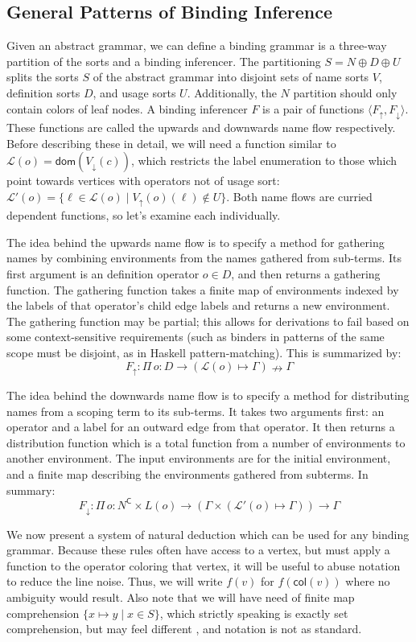 \documentclass[11pt]{article} %
\theoremstyle{definition}
\newcommand{\Ell}{\mathscr{L}}
\begin{document}
\subsection{General Patterns of Binding Inference}

Given an abstract grammar, we can define a binding grammar is a three-way partition of the sorts and a binding inferencer.
The partitioning $S = N \oplus D \oplus U$ splits the sorts $S$ of the abstract grammar into disjoint sets of name sorts $V$, definition sorts $D$, and usage sorts $U$.
Additionally, the $N$ partition should only contain colors of leaf nodes.
A binding inferencer $F$ is a pair of functions $\langle F_\uparrow, F_\downarrow \rangle$.
These functions are called the upwards and downwards name flow respectively.
Before describing these in detail, we will need a function similar to $\Ell(o) = \mathsf{dom}(V_\downarrow(c))$, which restricts the label enumeration to those which point towards vertices with operators not of usage sort: $\Ell'(o) = \{\ell \in \Ell(o) \mid V_\uparrow(o)(\ell) \nin U\}$.
Both name flows are curried dependent functions, so let's examine each individually.

The idea behind the upwards name flow is to specify a method for gathering names by combining environments from the names gathered from sub-terms.
Its first argument is an definition operator $o \in D$, and then returns a gathering function.
The gathering function takes a finite map of environments indexed by the labels of that operator's child edge labels and returns a new environment.
The gathering function may be partial; this allows for derivations to fail based on some context-sensitive requirements (such as binders in patterns of the same scope must be disjoint, as in Haskell pattern-matching).
This is summarized by:
    $$F_\uparrow : \Pi\,o{:}D \to (\Ell(o) \mapsto \Gamma) \nrightarrow \Gamma$$

The idea behind the downwards name flow is to specify a method for distributing names from a scoping term to its sub-terms.
It takes two arguments first: an operator and a label for an outward edge from that operator.
It then returns a distribution function which is a total function from a number of environments to another environment.
The input environments are for the initial environment, and a finite map describing the environments gathered from subterms.
In summary:
    $$F_\downarrow : \Pi\,o{:}N^\mathsf{C} \times L(o) \to (\Gamma \times (\Ell'(o) \mapsto \Gamma)) \to \Gamma$$

We now present a system of natural deduction which can be used for any binding grammar.
Because these rules often have access to a vertex, but must apply a function to the operator coloring that vertex, it will be useful to abuse notation to reduce the line noise.
Thus, we will write $f(v)$ for $f(\mathsf{col}(v))$ where no ambiguity would result.
Also note that we will have need of finite map comprehension $\{x \mapsto y \mid x \in S\}$, which strictly speaking is exactly set comprehension, but may feel different , and notation is not as standard.
\end{document}
